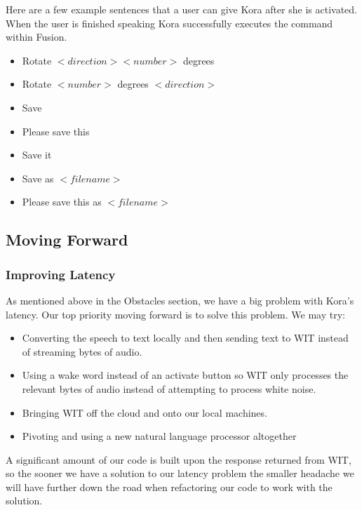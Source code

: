 \documentclass[onecolumn, draftclsnofoot,10pt, compsoc]{IEEEtran}
\begin{document}
			Here are a few example sentences that a user can give Kora after she is activated.
			When the user is finished speaking Kora successfully executes the command within Fusion.
			\begin{itemize}
				\item 
				Rotate $<direction> <number>$ degrees
				\item 
				Rotate $<number>$ degrees $<direction>$

				\item 
				Save
				
				\item 
				Please save this
				
				\item
				Save it

				\item 
				Save as $<file name>$
				
				\item 
				Please save this as $<file name>$
			\end{itemize}
		
		
	\subsection{Moving Forward}
		\subsubsection{Improving Latency}
			As mentioned above in the Obstacles section, we have a big problem with Kora's latency.
			Our top priority moving forward is to solve this problem.
			We may try:
			\begin{itemize}
				\item
				Converting the speech to text locally and then sending text to WIT instead of streaming bytes of audio.
				
				\item
				Using a wake word instead of an activate button so WIT only processes the relevant bytes of audio instead of attempting to process white noise.
				
				\item
				Bringing WIT off the cloud and onto our local machines.
				
				\item
				Pivoting and using a new natural language processor altogether
			\end{itemize}
			A significant amount of our code is built upon the response returned from WIT, so the sooner we have a solution to our latency problem the smaller headache we will have further down the road when refactoring our code to work with the solution.
		
\end{document}
